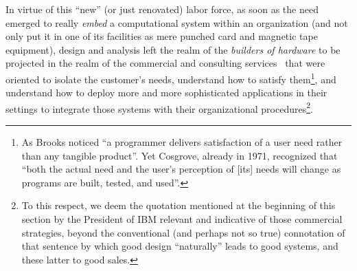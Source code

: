 \documentclass{article}
\begin{document}
In virtue of this ``new'' (or just renovated) labor force, as soon as the need emerged to really \emph{embed} a computational system within an organization (and not only put it in one of its facilities as mere punched card and magnetic tape equipment), design and analysis left the realm of the \emph{builders of hardware} to be projected in the realm of the commercial and consulting services~\citep{haigh_inventing_2011} that were oriented to isolate the customer's needs, understand how to satisfy them\footnote{As Brooks noticed ``a programmer delivers satisfaction of a user need rather than any tangible product''. Yet Cosgrove, already in 1971, recognized that ``both the actual need and the user's perception of [its] needs will change as programs are built, tested, and used''.}, and understand how to deploy more and more sophisticated applications in their settings to integrate those systems with their organizational procedures\footnote{To this respect, we deem the quotation mentioned at the beginning of this section by the President of IBM relevant and indicative of those commercial strategies, beyond the conventional (and perhaps not so true) connotation of that sentence by which good design ``naturally'' leads to good systems, and these latter to good sales.}. 
\end{document}
